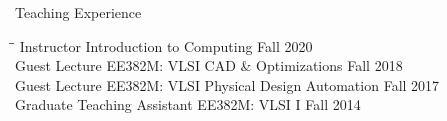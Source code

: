 \begin{rSection}{Teaching Experience}

\begin{tabbing}
\hspace{3.3in}\= \hspace{3.1in}\= \kill
Instructor \> Introduction to Computing \> Fall 2020 \\
Guest Lecture \> EE382M: VLSI CAD \& Optimizations \> Fall 2018 \\
Guest Lecture \> EE382M: VLSI Physical Design Automation \> Fall 2017 \\
Graduate Teaching Assistant \> EE382M: VLSI I \> Fall 2014 
\end{tabbing}

\end{rSection}
